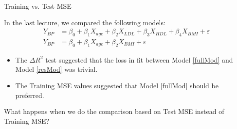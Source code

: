 \documentclass{beamer}\usepackage[]{graphicx}\usepackage[]{color}
\begin{document}
\watermarkon %

\begin{frame}{Training vs. Test MSE}

  In the last lecture, we compared the following models:
  \begin{align}
    Y_{BP} &= \beta_0 + \beta_1 X_{age} + \beta_2 X_{LDL} + \beta_3 X_{HDL} + 
    \beta_4 X_{BMI} + \varepsilon \label{fullMod}\\
    Y_{BP} &= \beta_0 + \beta_1 X_{age} + \beta_2 X_{BMI} + 
    \varepsilon \label{resMod}
  \end{align}
  \begin{itemize}
  \item The $\Delta R^2$ test suggested that the loss in fit between Model 
    \ref{fullMod} and Model \ref{resMod} was trivial.
    \vc
  \item The Training MSE values suggested that Model \ref{fullMod} should be 
    preferred.
  \end{itemize}
  \vb
  What happens when we do the comparison based on Test MSE instead of Training 
  MSE?
  
\end{frame}

\watermarkoff %
\end{document}
